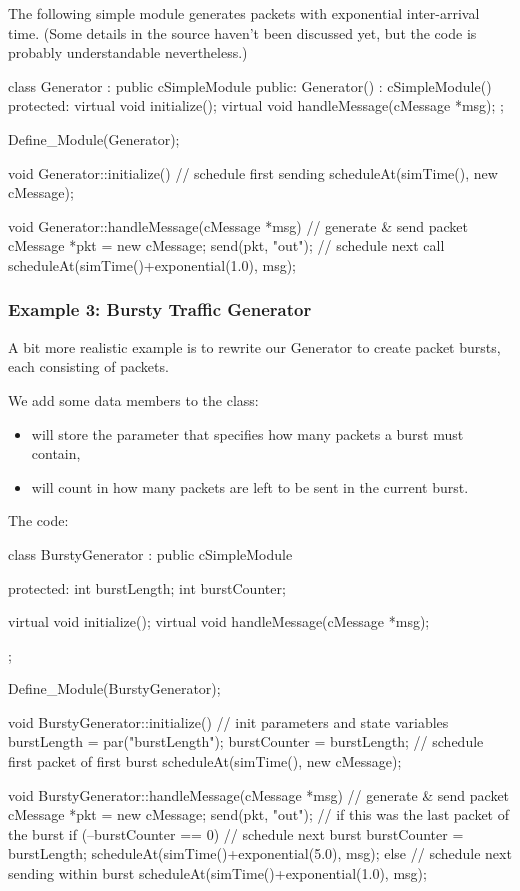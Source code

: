 The following simple module generates packets with exponential
inter-arrival time. (Some details in the source haven't been
discussed yet, but the code is probably understandable nevertheless.)


\begin{cpp}
class Generator : public cSimpleModule
{
  public:
    Generator() : cSimpleModule() {}
  protected:
    virtual void initialize();
    virtual void handleMessage(cMessage *msg);
};

Define_Module(Generator);

void Generator::initialize()
{
    // schedule first sending
    scheduleAt(simTime(), new cMessage);
}

void Generator::handleMessage(cMessage *msg)
{
    // generate & send packet
    cMessage *pkt = new cMessage;
    send(pkt, "out");
    // schedule next call
    scheduleAt(simTime()+exponential(1.0), msg);
}
\end{cpp}



\subsubsection{Example 3: Bursty Traffic Generator}
\label{sec:simple-modules:handlemessage:bursty-trafgen-example}

A bit more realistic example is to rewrite our Generator to create
packet bursts, each consisting of  packets.

We add some data members to the class:
\begin{itemize}
\item {} will store the parameter that specifies how many
    packets a burst must contain,
\item {} will count in how many packets are left to be sent
    in the current burst.
\end{itemize}

The code:

\begin{cpp}
class BurstyGenerator : public cSimpleModule
{
  protected:
    int burstLength;
    int burstCounter;

    virtual void initialize();
    virtual void handleMessage(cMessage *msg);
};

Define_Module(BurstyGenerator);

void BurstyGenerator::initialize()
{
    // init parameters and state variables
    burstLength = par("burstLength");
    burstCounter = burstLength;
    // schedule first packet of first burst
    scheduleAt(simTime(), new cMessage);
}

void BurstyGenerator::handleMessage(cMessage *msg)
{
    // generate & send packet
    cMessage *pkt = new cMessage;
    send(pkt, "out");
    // if this was the last packet of the burst
    if (--burstCounter == 0) {
        // schedule next burst
        burstCounter = burstLength;
        scheduleAt(simTime()+exponential(5.0), msg);
    }
    else {
        // schedule next sending within burst
        scheduleAt(simTime()+exponential(1.0), msg);
    }
}
\end{cpp}



